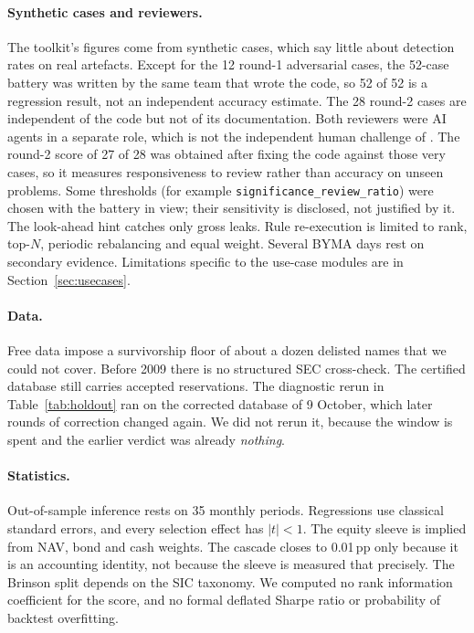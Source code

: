 \documentclass[11pt]{article}
\begin{document}
\paragraph{Synthetic cases and reviewers.} The toolkit's figures come from synthetic cases, which say little about detection rates on real artefacts. Except for the 12 round-1 adversarial cases, the 52-case battery was written by the same team that wrote the code, so 52 of 52 is a regression result, not an independent accuracy estimate. The 28 round-2 cases are independent of the code but not of its documentation. Both reviewers were AI agents in a separate role, which is not the independent human challenge of \citet{SR117}. The round-2 score of 27 of 28 was obtained after fixing the code against those very cases, so it measures responsiveness to review rather than accuracy on unseen problems. Some thresholds (for example \texttt{significance\_review\_ratio}) were chosen with the battery in view; their sensitivity is disclosed, not justified by it. The look-ahead hint catches only gross leaks. Rule re-execution is limited to rank, top-$N$, periodic rebalancing and equal weight. Several BYMA days rest on secondary evidence. Limitations specific to the use-case modules are in Section~\ref{sec:usecases}.

\paragraph{Data.} Free data impose a survivorship floor of about a dozen delisted names that we could not cover. Before 2009 there is no structured SEC cross-check. The certified database still carries accepted reservations. The diagnostic rerun in Table~\ref{tab:holdout} ran on the corrected database of 9 October, which later rounds of correction changed again. We did not rerun it, because the window is spent and the earlier verdict was already \emph{nothing}.

\paragraph{Statistics.} Out-of-sample inference rests on 35 monthly periods. Regressions use classical standard errors, and every selection effect has $|t|<1$. The equity sleeve is implied from NAV, bond and cash weights. The cascade closes to 0.01\,pp only because it is an accounting identity, not because the sleeve is measured that precisely. The Brinson split depends on the SIC taxonomy. We computed no rank information coefficient for the score, and no formal deflated Sharpe ratio or probability of backtest overfitting.
\end{document}
